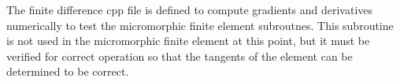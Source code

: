 The finite difference cpp file is defined to compute gradients and derivatives numerically to test the micromorphic finite element subroutnes. This subroutine is not used in the micromorphic finite element at this point, but it must be verified for correct operation so that the tangents of the element can be determined to be correct.
